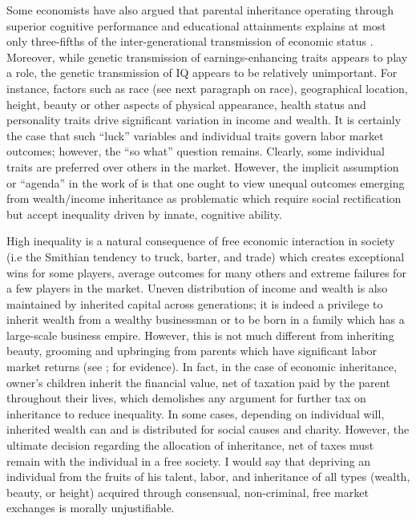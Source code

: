 \documentclass[12pt]{article}
\newcommand{\1}{\mathbbm 1}
\begin{document}
	    Some economists have also argued that parental inheritance operating through superior cognitive performance and educational attainments explains at most only three-fifths of the inter-generational transmission of economic status \cite{bowles2002inheritance}. Moreover, while genetic transmission of earnings-enhancing traits appears to play a role, the genetic transmission of IQ appears to be relatively unimportant. For instance, factors such as race (see next paragraph on race), geographical location, height, beauty or other aspects of physical appearance, health status and personality traits drive significant variation in income and wealth. It is certainly the case that such ``luck'' variables and individual traits govern labor market outcomes; however, the ``so what'' question remains. Clearly, some individual traits are preferred over others in the market. However, the implicit assumption or ``agenda'' in the work of \cite{bowles2002inheritance} is that one ought to view unequal outcomes emerging from wealth/income inheritance as problematic which require social rectification but accept inequality driven by innate, cognitive ability. 
	    
	    
	    
	    High inequality is a natural consequence of free economic interaction in society (i.e the Smithian tendency to truck, barter, and trade) which creates exceptional wins for some players, average outcomes for many others and extreme failures for a few players in the market. Uneven distribution of income and wealth is also maintained by inherited capital across generations; it is indeed a privilege to inherit wealth from a wealthy businessman or to be born in a family which has a large-scale business empire. However, this is not much different from inheriting beauty, grooming and upbringing from parents which have significant labor market returns (see \cite{mobius2006beauty}; \cite{robins2011beauty} for evidence). In fact, in the case of economic inheritance, owner's children inherit the financial value, net of taxation paid by the parent throughout their lives, which demolishes any argument for further tax on inheritance to reduce inequality. In some cases, depending on individual will, inherited wealth can and is distributed for social causes and charity. However, the ultimate decision regarding the allocation of inheritance, net of taxes must remain with the individual in a free society. I would say that depriving an individual from the fruits of his talent, labor, and inheritance of all types (wealth, beauty, or height) acquired through consensual, non-criminal, free market exchanges is morally unjustifiable. 
	    
\end{document}
